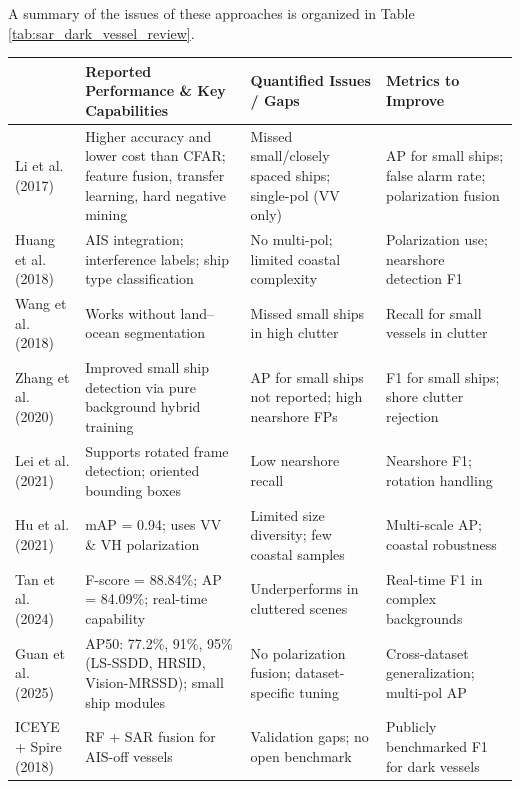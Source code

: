 \documentclass{article}
\begin{document}
	A summary of the issues of these approaches is organized in Table \ref{tab:sar_dark_vessel_review}.
		\newpage
	\begin{table}[h!]
		\centering
		\footnotesize
		\renewcommand{\arraystretch}{1.2} %
		\begin{tabularx}{\textwidth}{@{}p{2.7cm}X X X@{}} %
			\toprule
			\textbf{\raggedright Author \& Year} & \textbf{Reported Performance \& Key Capabilities} & \textbf{Quantified Issues / Gaps} & \textbf{Metrics to Improve} \\
			\midrule
			\raggedright Li et al. (2017) \cite{8124934} & Higher accuracy and lower cost than CFAR; feature fusion, transfer learning, hard negative mining & Missed small/closely spaced ships; single-pol (VV only) & AP for small ships; false alarm rate; polarization fusion \\
			\raggedright Huang et al. (2018) \cite{8124929} & AIS integration; interference labels; ship type classification & No multi-pol; limited coastal complexity & Polarization use; nearshore detection F1 \\
			\raggedright Wang et al. (2018) \cite{rs11070765} & Works without land–ocean segmentation & Missed small ships in high clutter & Recall for small vessels in clutter \\
			\raggedright Zhang et al. (2020) \cite{rs12182997} & Improved small ship detection via pure background hybrid training & AP for small ships not reported; high nearshore FPs & F1 for small ships; shore clutter rejection \\
			\raggedright Lei et al. (2021) \cite{rs13245104} & Supports rotated frame detection; oriented bounding boxes & Low nearshore recall & Nearshore F1; rotation handling \\
			\raggedright Hu et al. (2021) \cite{s21248478} & mAP = 0.94; uses VV \& VH polarization & Limited size diversity; few coastal samples & Multi-scale AP; coastal robustness \\
			\raggedright Tan et al. (2024) \cite{tan2024yolo} & F-score = 88.84\%; AP = 84.09\%; real-time capability & Underperforms in cluttered scenes & Real-time F1 in complex backgrounds \\
			\raggedright Guan et al. (2025) \cite{guan2025sar} & AP50: 77.2\%, 91\%, 95\% (LS-SSDD, HRSID, Vision-MRSSD); small ship modules & No polarization fusion; dataset-specific tuning & Cross-dataset generalization; multi-pol AP \\
			\raggedright ICEYE + Spire (2018) & RF + SAR fusion for AIS-off vessels & Validation gaps; no open benchmark & Publicly benchmarked F1 for dark vessels \\

\end{tabularx}
\end{table}
\end{document}
